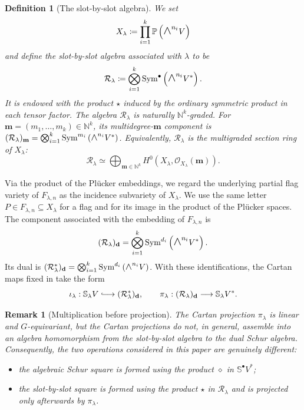 \documentclass[a4paper,reqno]{amsart}
\theoremstyle{plainnopunct}
\theoremstyle{definitionnopunct}
\newtheorem{definition}[definition]{Definition}
\newtheorem{remark}[remark]{Remark}
\newcommand{\superwedge}{\mathlarger{\mathlarger{\wedge}}}
\renewcommand{\P}{\mathbb{P}}
\newcommand{\N}{\mathbb{N}}
\renewcommand{\S}{\mathbb{S}}
\newcommand{\cO}{\mathcal{O}}
\newcommand{\cR}{\mathcal{R}}
\newcommand{\Sym}{\operatorname{Sym}}
\newcommand{\bd}{\mathbf{d}}
\begin{document}
\begin{definition}[The slot-by-slot algebra]
\label{def: slot-by-slot algebra}
We set
\[
X_\lambda
\coloneq
\prod_{i=1}^k
\P\left(
\superwedge^{n_i}V
\right)
\]
and define the \emph{slot-by-slot algebra associated with $\lambda$}
to be
\[
\cR_\lambda
\coloneq
\bigotimes_{i=1}^k
\Sym^\bullet
\left(
\superwedge^{n_i}V^*
\right).
\]
It is endowed with the product $\star$ induced by the ordinary
symmetric product in each tensor factor. The algebra $\cR_\lambda$ is naturally $\N^k$-graded. For $\mathbf m=(m_1,\ldots,m_k)\in\N^k$,
its multidegree-$\mathbf m$ component is $(\cR_\lambda)_{\mathbf m}
=
\bigotimes_{i=1}^k
\Sym^{m_i}
\left(
\superwedge^{n_i}V^*
\right)$.
Equivalently, $\cR_\lambda$ is the multigraded section ring of $X_\lambda$:
\[
\cR_\lambda
\simeq
\bigoplus_{\mathbf m\in\N^k}
H^0
\left(
X_\lambda,
\cO_{X_\lambda}(\mathbf m)
\right).
\]
\end{definition}

Via the product of the Pl\"ucker embeddings, we regard the underlying
partial flag variety of $F_{\lambda,n}$ as the incidence subvariety
of $X_\lambda$. We use the same letter
$P\in F_{\lambda,n}\subseteq X_\lambda$ for a flag and for its image in the product of the Pl\"ucker spaces. The component associated with the embedding of
$F_{\lambda,n}$ is
\[
(\cR_\lambda)_{\bd}
=
\bigotimes_{i=1}^k
\Sym^{d_i}
\left(
\superwedge^{n_i}V^*
\right).
\]
Its dual is $(\cR_\lambda^*)_{\bd}
=
\bigotimes_{i=1}^k
\Sym^{d_i}
\left(
\superwedge^{n_i}V
\right)$. With these identifications, the Cartan maps fixed in
 take the form
\[
\iota_\lambda:
\S_\lambda V
\lhook\joinrel\longrightarrow
(\cR_\lambda^*)_{\bd},
\qquad
\pi_\lambda:
(\cR_\lambda)_{\bd}
\longrightarrow
\S_\lambda V^*.
\]

\begin{remark}[Multiplication before projection]
\label{rem: multiplication before projection}
The Cartan projection $\pi_\lambda$ is linear and
$G$-equivariant, but the Cartan projections do not, in general,
assemble into an algebra homomorphism from the slot-by-slot algebra to
the dual Schur algebra. Consequently, the two operations considered
in this paper are genuinely different:

\begin{itemize}
    \item the algebraic Schur square is formed using the product
    $\diamond$ in $\S^\bullet V^*$;
    \item the slot-by-slot square is formed using the product
    $\star$ in $\cR_\lambda$ and is projected only afterwards by
    $\pi_\lambda$.
\end{itemize}
\end{remark}
\end{document}
